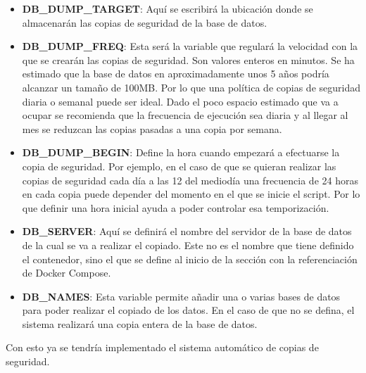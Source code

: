 \begin{itemize}
    \item \textbf{DB\_DUMP\_TARGET}: Aquí se escribirá la ubicación donde se almacenarán las copias de seguridad de la base de datos.
    \item \textbf{DB\_DUMP\_FREQ}: Esta será la variable que regulará la velocidad con la que se crearán las copias de seguridad. Son valores enteros en minutos. Se ha estimado que la base de datos en aproximadamente unos 5 años podría alcanzar un tamaño de 100MB. Por lo que una política de copias de seguridad diaria o semanal puede ser ideal. Dado el poco espacio estimado que va a ocupar se recomienda que la frecuencia de ejecución sea diaria y al llegar al mes se reduzcan las copias pasadas a una copia por semana.
    \item \textbf{DB\_DUMP\_BEGIN}: Define la hora cuando empezará a efectuarse la copia de seguridad. Por ejemplo, en el caso de que se quieran realizar las copias de seguridad cada día a las 12 del mediodía una frecuencia de 24 horas en cada copia puede depender del momento en el que se inicie el script. Por lo que definir una hora inicial ayuda a poder controlar esa temporización.
    \item \textbf{DB\_SERVER}: Aquí se definirá el nombre del servidor de la base de datos de la cual se va a realizar el copiado. Este no es el nombre que tiene definido el contenedor, sino el que se define al inicio de la sección con la referenciación de Docker Compose.
    \item \textbf{DB\_NAMES}: Esta variable permite añadir una o varias bases de datos para poder realizar el copiado de los datos. En el caso de que no se defina, el sistema realizará una copia entera de la base de datos.
\end{itemize}
\vspace{\baselineskip}
Con esto ya se tendría implementado el sistema automático de copias de seguridad.
